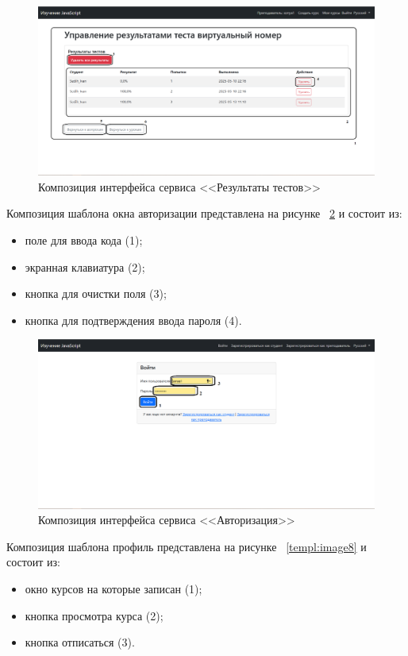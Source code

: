 \begin{figure}[h]
	\centering
	\includegraphics[width=1\linewidth]{images/результаты}
	\caption{Композиция интерфейса сервиса <<Результаты тестов>>}
	\label{templ:image6}
\end{figure}
\newpage
Композиция шаблона окна авторизации представлена на рисунке ~\ref{templ:image7} и состоит из:

\begin{itemize}
	\item поле для ввода кода (1);
	\item экранная клавиатура (2);
	\item кнопка для очистки поля (3);
	\item кнопка для подтверждения ввода пароля (4).
\end{itemize}

\begin{figure}[h]
	\centering
	\includegraphics[width=1\linewidth]{images/Авторизация}
	\caption{Композиция интерфейса сервиса <<Авторизация>>}
	\label{templ:image7}
\end{figure}

Композиция шаблона профиль представлена на рисунке ~\ref{templ:image8} и состоит из:

\begin{itemize}
	\item окно курсов на которые записан (1);
	\item кнопка просмотра курса (2);
	\item кнопка отписаться (3).
\end{itemize}

